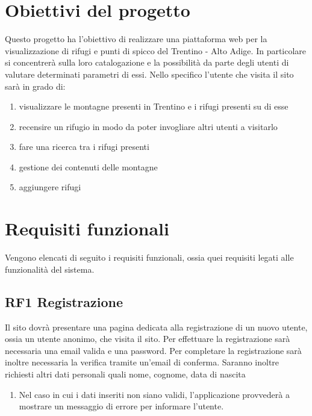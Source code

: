 \documentclass[a4paper,12pt]{article}
\begin{document}
\section{Obiettivi del progetto}

Questo progetto ha l’obiettivo di realizzare una piattaforma web per la visualizzazione di rifugi e punti di spicco del Trentino - Alto Adige. In particolare si concentrerà sulla loro catalogazione e la possibilità da parte degli utenti di valutare determinati parametri di essi. 
Nello specifico l'utente che visita il sito sarà in grado di:

\begin{enumerate}
    \item visualizzare le montagne presenti in Trentino e i rifugi presenti su di esse
    \item recensire un rifugio in modo da poter invogliare altri utenti a visitarlo
    \item fare una ricerca tra i rifugi presenti
    \item gestione dei contenuti delle montagne
    \item aggiungere rifugi

\end{enumerate}
    
\newpage

\section{Requisiti funzionali}

Vengono elencati di seguito i requisiti funzionali, ossia quei requisiti legati alle funzionalità del sistema.


\subsection*{RF1 Registrazione}
Il sito dovrà presentare una pagina dedicata alla registrazione di un nuovo utente, ossia un utente anonimo, che visita il sito. Per effettuare la registrazione sarà necessaria una email valida e una password. Per completare la registrazione sarà inoltre necessaria la verifica tramite un'email di conferma.
Saranno inoltre richiesti altri dati personali quali nome, cognome, data di nascita
\begin{enumerate} [leftmargin=40pt]
    \item Nel caso in cui i dati inseriti non siano validi, l'applicazione provvederà a mostrare un messaggio di errore per informare l'utente. 
\end{enumerate}
\end{document}
